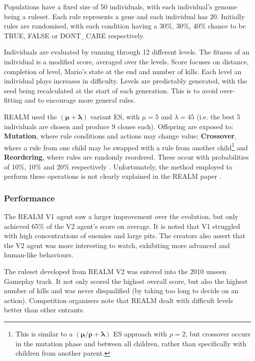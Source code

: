 Populations have a fixed size of 50 individuals, with each individual's genome being a ruleset. Each rule represents a gene and each individual has 20. Initially rules are randomised, with each condition having a 30\%, 30\%, 40\% chance to be {\footnotesize TRUE}, {\footnotesize FALSE} or {\footnotesize DONT\_CARE} respectively.

Individuals are evaluated by running through 12 different levels. The fitness of an individual is a modified score, averaged over the levels. Score focuses on distance, completion of level, Mario's state at the end and number of kills. Each level an individual plays increases in difficulty. Levels are predictably generated, with the seed being recalculated at the start of each generation. This is to avoid over-fitting and to encourage more general rules.

REALM used the $\pmb{(\mu  + \lambda)}$ variant ES, with $\mu = 5$ and $\lambda = 45$ (i.e. the best 5 individuals are chosen and produce 9 clones each). Offspring are exposed to: \textbf{Mutation}, where rule conditions and actions may change value; \textbf{Crossover}, where a rule from one child may be swapped with a rule from another child\footnote{This is similar to a  $\pmb{(\mu/\rho  + \lambda)}$ ES approach with $\rho = 2$, but crossover occurs in the mutation phase and between all children, rather than specifically with children from another parent.} and \textbf{Reordering}, where rules are randomly reordered. These occur with probabilities of 10\%, 10\% and 20\% respectively \cite[p.~88]{realm}. Unfortunately, the method employed to perform these operations is not clearly explained in the REALM paper \cite{realm}.

\subsubsection*{\hspace{6pt}Performance}

The REALM V1 agent saw a larger improvement over the evolution, but only achieved 65\% of the V2 agent's score on average. It is noted that V1 struggled with high concentrations of enemies and large pits. The creators also assert that the V2 agent was more interesting to watch, exhibiting more advanced and human-like behaviours. \cite[pp.~89-90]{realm}

The ruleset developed from REALM V2 was entered into the 2010 unseen Gameplay track. It not only scored the highest overall score, but also the highest number of kills and was never disqualified (by taking too long to decide on an action). Competition organisers note that REALM dealt with difficult levels better than other entrants. \cite[p.~10]{2012the}


